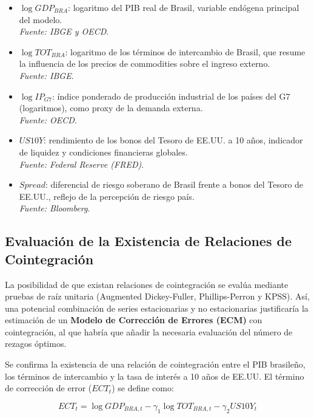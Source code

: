 \documentclass[3p,11pt]{elsarticle}
\begin{document}
\begin{itemize}
    \item $ \log GDP_{BRA} $: logaritmo del PIB real de Brasil, variable endógena principal del modelo. \\
    \textit{Fuente: IBGE y OECD}.

    \item $ \log TOT_{BRA} $: logaritmo de los términos de intercambio de Brasil, que resume la influencia de los precios de commodities sobre el ingreso externo. \\
    \textit{Fuente: IBGE}.

    \item $ \log IP_{G7} $: índice ponderado de producción industrial de los países del G7 (logaritmos), como proxy de la demanda externa. \\
    \textit{Fuente: OECD}. 

    \item $ US10Y $: rendimiento de los bonos del Tesoro de EE.UU. a 10 años, indicador de liquidez y condiciones financieras globales. \\
    \textit{Fuente: Federal Reserve (FRED)}.

    \item $ Spread $: diferencial de riesgo soberano de Brasil frente a bonos del Tesoro de EE.UU., reflejo de la percepción de riesgo país. \\
    \textit{Fuente: Bloomberg}.
\end{itemize}

\subsection{Evaluación de la Existencia de Relaciones de Cointegración}

La posibilidad de que existan relaciones de cointegración se evalúa mediante pruebas de raíz unitaria (Augmented Dickey-Fuller, Phillips-Perron y KPSS). Así, una potencial combinación de series estacionarias y no estacionarias justificaría la estimación de un \textbf{Modelo de Corrección de Errores (ECM)} con cointegración, al que habría que añadir la necesaria evaluación del número de rezagos óptimos.

Se confirma la existencia de una relación de cointegración entre el PIB brasileño, los términos de intercambio
y la tasa de interés a 10 años de EE.UU. El término de corrección de error ($ECT_t$) se define como:

\[
ECT_t = \log GDP_{BRA,t} - \gamma_1 \log TOT_{BRA,t} - \gamma_2 US10Y_t
\]
\end{document}
